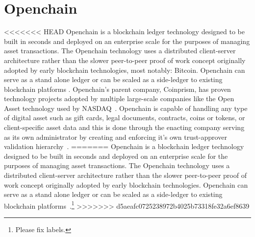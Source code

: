 \section{Openchain}

<<<<<<< HEAD
Openchain is a blockchain ledger technology designed to be built in
seconds and deployed on an enterprise scale for the purposes of
managing asset transactions. The Openchain technology uses a
distributed client-server architecture rather than the slower
peer-to-peer proof of work concept originally adopted by early
blockchain technologies, most notably: Bitcoin. Openchain can serve as
a stand alone ledger or can be scaled as a side-ledger to existing
blockchain platforms \cite{hid-sp18-507-Openchain}. Openchain's parent
company, Coinprism, has proven technology projects adopted by multiple
large-scale companies like the Open Asset technology used by
NASDAQ~\cite{hid-sp18-507-BitcoinNews}. Openchain is capable of
handling any type of digital asset such as gift cards, legal
documents, contracts, coins or tokens, or client-specific asset data
and this is done through the enacting company serving as its own
administrator by creating and enforcing it's own trust-approver
validation hierarchy~\cite{hid-sp18-507-Coindesk}.
=======
Openchain is a blockchain ledger technology designed to be built in seconds and
deployed on an enterprise scale for the purposes of managing asset
transactions. The Openchain technology uses a distributed client-server
architecture rather than the slower peer-to-peer proof of work concept
originally adopted by early blockchain technologies. Openchain can serve as a
stand alone ledger or can be scaled as a side-ledger to existing blockchain
platforms~\cite{Openchain}.\footnote{Please fix labels.}
>>>>>>> d5aeafc0725238972b4025b73318fe32a6ef8639
